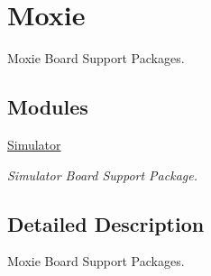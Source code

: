 \hypertarget{group__RTEMSBSPsMoxie}{}\section{Moxie}
\label{group__RTEMSBSPsMoxie}


Moxie Board Support Packages.  


\subsection*{Modules}
\begin{DoxyCompactItemize}
\item 
\mbox{\hyperlink{group__RTEMSBSPsMoxieMoxieSim}{Simulator}}
\begin{DoxyCompactList}\small\item\em Simulator Board Support Package. \end{DoxyCompactList}\end{DoxyCompactItemize}


\subsection{Detailed Description}
Moxie Board Support Packages. 

